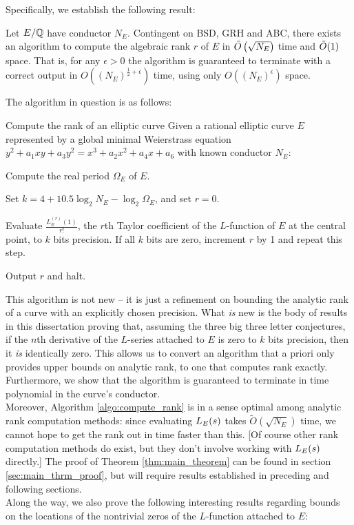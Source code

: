 Specifically, we establish the following result:
\begin{theorem}\label{thm:main_theorem}
Let $E/\mathbb{Q}$ have conductor $N_E$. Contingent on BSD, GRH and ABC, there exists an algorithm to compute the algebraic rank $r$ of $E$ in $\tilde{O}\left(\sqrt{N_E}\right)$ time and $\tilde{O}(1)$ space. That is, for any $\epsilon>0$ the algorithm is guaranteed to terminate with a correct output in $O\left((N_E)^{\frac{1}{2}+\epsilon}\right)$ time, using only $O\left((N_E)^{\epsilon}\right)$ space.
\end{theorem}
The algorithm in question is as follows:
\begin{algorithm}{Compute the rank of an elliptic curve}\label{algo:compute_rank}
Given a rational elliptic curve $E$ represented by a global minimal Weierstrass equation $y^2 + a_1 xy + a_3 y^2 = x^3 + a_2 x^2 + a_4 x + a_6$ with known conductor $N_E$:
\begin{steps}
\item Compute the real period $\Omega_E$ of $E$.
\item Set $k = 4 + 10.5 \log_2 N_E - \log_2 \Omega_E$, and set $r=0$.
\item Evaluate $\frac{L_E^{(r)}(1)}{r!}$, the $r$th Taylor coefficient of the $L$-function of $E$ at the central point, to $k$ bits precision. If all $k$ bits are zero, increment $r$ by 1 and repeat this step.
\item Output $r$ and halt.
\end{steps}
\end{algorithm}

This algorithm is not new -- it is just a refinement on bounding the analytic rank of a curve with an explicitly chosen precision. What {\it is} new is the body of results in this dissertation proving that, assuming the three big three letter conjectures, if the $n$th derivative of the $L$-series attached to $E$ is zero to $k$ bits precision, then it {\it is} identically zero. This allows us to convert an algorithm that a priori only provides upper bounds on analytic rank, to one that computes rank exactly. Furthermore, we show that the algorithm is guaranteed to terminate in time polynomial in the curve's conductor. \\

Moreover, Algorithm \ref{algo:compute_rank} is in a sense optimal among analytic rank computation methods: since evaluating $L_E(s)$ takes $\tilde{O}(\sqrt{N_E})$ time, we cannot hope to get the rank out in time faster than this. [Of course other rank computation methods do exist, but they don't involve working with $L_E(s)$ directly.] The proof of Theorem \ref{thm:main_theorem} can be found in section \ref{sec:main_thrm_proof}, but will require results established in preceding and following sections. \\

Along the way, we also prove the following interesting results regarding bounds on the locations of the nontrivial zeros of the $L$-function attached to $E$:

